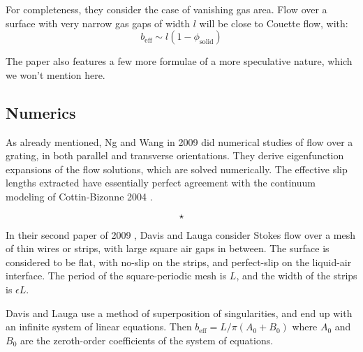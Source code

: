 \documentclass[a4paper]{report}
\newcommand{\beff}{\ensuremath{b_{\mathrm{eff}}}}
\newcommand{\phisol}{\ensuremath{\phi_{\mathrm{solid}}}}
\newcommand{\sep}{\begin{equation*} \star \end{equation*}}
\begin{document}
\vspace{1em}
For completeness, they consider the case of vanishing gas area.  Flow over a surface with very narrow gas gaps of width $l$ will be close to Couette flow, with:
\begin{equation*}
\beff \sim l (1-\phisol) 
\end{equation*}

The paper also features a few more formulae of a more speculative nature, which we won't mention here.

\subsection*{Numerics}

As already mentioned, Ng and Wang in 2009 \cite{NgWang2009} did numerical studies of flow over a grating, in both parallel and transverse orientations. They derive eigenfunction expansions of the flow solutions, which are solved numerically.  The effective slip lengths extracted have essentially perfect agreement with the continuum modeling of Cottin-Bizonne 2004 \cite{Cottin-Bizonne2004}.

\sep

In their second paper of 2009 \cite{DavisLauga2009b}, Davis and Lauga consider Stokes flow over a mesh of thin wires or strips, with large square air gaps in between.  The surface is considered to be flat, with no-slip on the strips, and perfect-slip on the liquid-air interface.  The period of the square-periodic mesh is $L$, and the width of the strips is $\epsilon L$.

\begin{center}
\end{center}

Davis and Lauga use a method of superposition of singularities, and end up with an infinite system of linear equations.  Then $\beff = L/\pi (A_0 + B_0)$ where $A_0$ and $B_0$ are the zeroth-order coefficients of the system of equations.
\end{document}
